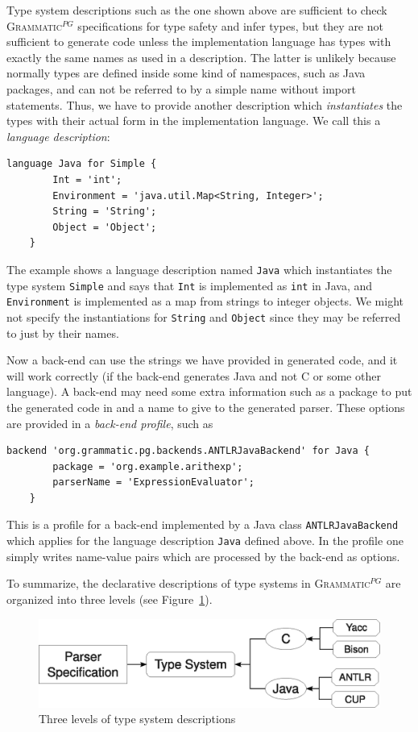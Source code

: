 \documentclass{informat} %
\newcommand{\figref}[1]{Figure~\ref{#1}}
\newcommand{\ATF}{\textsc{Grammatic}$^{PG}$}
\begin{document}
Type system descriptions such as the one shown above are sufficient to check \ATF{} specifications for type safety and infer types, but they are not sufficient to generate code unless the implementation language has types with exactly the same names as used in a description. The latter is unlikely because normally types are defined inside some kind of namespaces, such as Java packages, and can not be referred to by a simple name without import statements. Thus, we have to provide another description which \emph{instantiates} the types with their actual form in the implementation language. We call this a \emph{language description}:
\begin{lstlisting}[language=Typesystem]
	language Java for Simple {
		Int = 'int';
		Environment = 'java.util.Map<String, Integer>';
		String = 'String';
		Object = 'Object';
	}
\end{lstlisting}
The example shows a language description named \texttt{Java} which instantiates the type system \texttt{Simple} and says that \texttt{Int} is implemented as \texttt{int} in Java, and \texttt{Environment} is implemented as a map from strings to integer objects. We might not specify the instantiations for \texttt{String} and \texttt{Object} since they may be referred to just by their names.

Now a back-end can use the strings we have provided in generated code, and it will work correctly (if the back-end generates Java and not C or some other language). A back-end may need some extra information such as a package to put the generated code in and a name to give to the generated parser. These options are provided in a \emph{back-end profile}, such as
\begin{lstlisting}[language=Typesystem]
	backend 'org.grammatic.pg.backends.ANTLRJavaBackend' for Java {
		package = 'org.example.arithexp';
		parserName = 'ExpressionEvaluator';
	}
\end{lstlisting}

This is a profile for a back-end implemented by a Java class \texttt{ANTLRJavaBackend} which applies for the language description \texttt{Java} defined above. In the profile one simply writes name-value pairs which are processed by the back-end as options.

To summarize, the declarative descriptions of type systems in \ATF{} are organized into three levels (see \figref{typesystem}). 

\begin{figure}[htbp]
		\includegraphics[width=\textwidth]{typesystem}
		\caption{Three levels of type system descriptions}\label{typesystem}
\end{figure}
\end{document}
